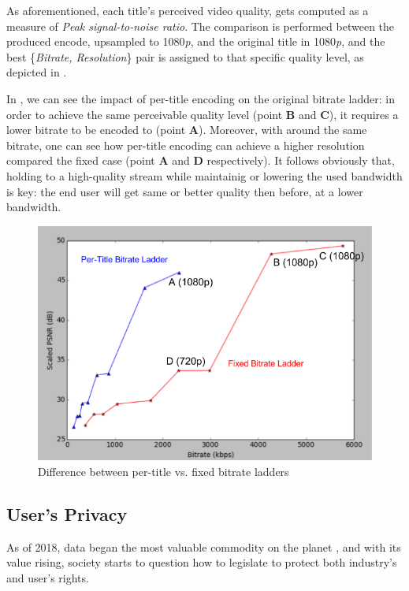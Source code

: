 As aforementioned, each title's perceived video quality, gets computed as a
measure of \emph{Peak signal-to-noise ratio}. The comparison is performed
between the produced encode, upsampled to 1080\emph{p}, and the original title
in 1080\emph{p}, and the best \{\emph{Bitrate, Resolution}\} pair is assigned
to that specific quality level, as depicted in .

In , we can see the impact of per-title encoding on
the original bitrate ladder: in order to achieve the same perceivable quality
level (point \textbf{B} and \textbf{C}), it requires a lower bitrate to be
encoded to (point \textbf{A}).  Moreover, with around the same bitrate, one can
see how per-title encoding can achieve a higher resolution compared the fixed
case (point \textbf{A} and \textbf{D} respectively). It follows obviously that,
holding to a high-quality stream while maintainig or lowering the used
bandwidth is key: the end user will get same or better quality then before, at
a lower bandwidth.

\begin{figure}[!htb]
  \centering
  \includegraphics[width=0.9\columnwidth]{img/pertitlevsfixed.png}
  \caption{Difference between per-title vs. fixed bitrate ladders}
  \label{fig:new-vs-old-ladder}
\end{figure}

\subsection{User's Privacy}\label{sec:privacy}

As of 2018, data began the most valuable commodity on the planet
\cite{data-value}, and with its value rising, society starts to question how to
legislate to protect both industry's and user's rights.

